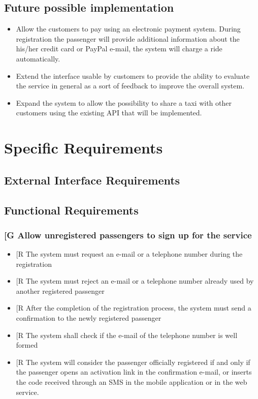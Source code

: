 \documentclass[a4paper,12pt]{article}%
\newcounter{goals_counter}
\newcounter{func_req_counter}
\begin{document}
\subsection{Future possible implementation}
\begin{itemize}
\item Allow the customers to pay using an electronic payment system. During registration the passenger will provide additional information about the his/her credit card or PayPal e-mail, the system will charge a ride automatically.
\item Extend the interface usable by customers to provide the ability to evaluate the service in general as a sort of feedback to improve the overall system.
\item Expand the system to allow the possibility to share a taxi with other customers using the existing API that will be implemented.
\end{itemize}
\newpage
\section{Specific Requirements}
\subsection{External Interface Requirements}
\subsection{Functional Requirements}
\setcounter{goals_counter}{1}
\subsubsection{\label{goal\arabic{goals_counter}}{[}G\arabic{goals_counter}{]} Allow unregistered passengers to sign up for the service}
\begin{itemize}
\item {[}R\arabic{func_req_counter}{]} The system must request an e-mail or a telephone number during the registration
\item {[}R\arabic{func_req_counter}{]} The system must reject an e-mail or a telephone number already used by another registered passenger
\item {[}R\arabic{func_req_counter}{]} After the completion of the registration process, the system must send a confirmation to the newly registered passenger
\item {[}R\arabic{func_req_counter}{]} The system shall check if the e-mail of the telephone number is well formed
\item {[}R\arabic{func_req_counter}{]} The system will consider the passenger officially registered if and only if the passenger opens an activation link in the confirmation e-mail, or inserts the code received through an SMS in the mobile application or in the web service.
\end{itemize}
\setcounter{func_req_counter}{1}
\end{document}
